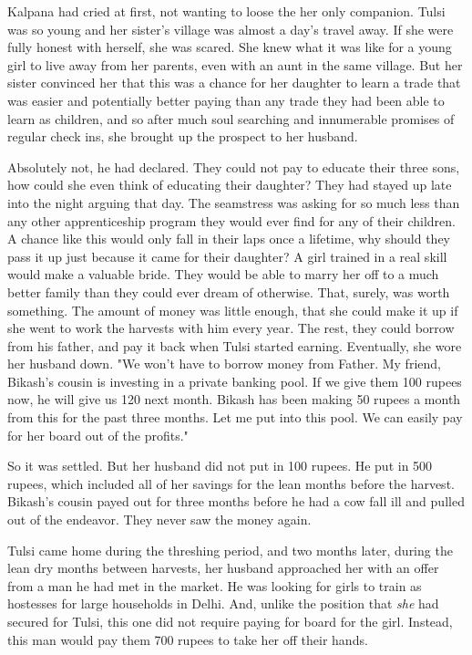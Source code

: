 \documentclass{amsart}
\begin{document}
	Kalpana had cried at first, not wanting to loose the her only companion. 
	Tulsi was so young and her sister's village was almost a day's travel
	away. If she were fully honest with herself, she was scared. She knew what it was
	like for a young girl to live away from her parents, even with an aunt in the same
	village. But her sister convinced her that this was a chance for her daughter to
	learn a trade that was easier and potentially better paying than any trade they
	had been able to learn as children, and so after much soul searching and innumerable 
	promises of regular check ins, she brought up the prospect to her husband.
	
	Absolutely not, he had declared. They could not pay to educate their three sons,
	how could she even think of educating their daughter? They had stayed up late into
	the night arguing that day. The seamstress was asking for so much less than any other
	apprenticeship program they would ever find for any of their children. A chance like
	this would only fall in their laps once a lifetime, why should they pass it up
	just because it came for their daughter? A girl trained in a real skill would
	make a valuable bride. They would be able to marry her off to a much better
	family than they could ever dream of otherwise. That, surely, was worth
	something. The amount of money was little enough, that she could make it up if
	she went to work the harvests with him every year. The rest, they could borrow
	from his father, and pay it back when Tulsi started earning. Eventually, she
	wore her husband down. "We won't have to borrow money from Father. My friend,
	Bikash's cousin is investing in a private banking pool. If we give them 100
	rupees now, he will give us 120 next month. Bikash has been making 50 rupees a
	month from this for the past three months. Let me put into this pool. We can
	easily pay for her board out of the profits." 
	
	So it was settled. But her husband did not put in 100 rupees. He put in 500
	rupees, which included all of her savings for the lean months before the
	harvest. Bikash's cousin payed out for three months before he had a cow fall ill and pulled out of the endeavor. They never saw the money again. 
	
	Tulsi came home
	during the threshing period, and two months later, during the lean dry months
	between harvests, her husband approached her with an offer from a man he had met
	in the market. He was looking for girls to train as hostesses for large
	households in Delhi. And, unlike the position that \emph{she} had secured for
	Tulsi, this one did not require paying for board for the girl. Instead, this man
	would pay them 700 rupees to take her off their hands. 
	
\end{document}
